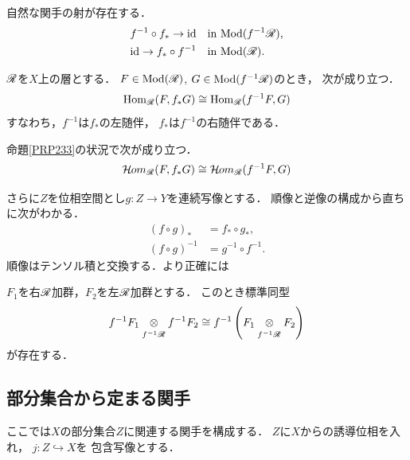 自然な関手の射が存在する．
\begin{align}
    f^{-1}\circ f_{\ast}\to\mathop{\mathrm{id}}\nolimits&\quad \text{in \(\mathop{\mathrm{Mod}}\nolimits(f^{-1}\mathscr{R})\),}\label{eq234}\\
    \mathop{\mathrm{id}}\nolimits\to f_{\ast}\circ f^{-1}&\quad\text{in \(\mathop{\mathrm{Mod}}\nolimits(\mathscr{R})\).}\label{eq235}
\end{align}

\begin{leftbar}
\begin{PRP}\label{PRP233}
    \(\mathscr{R}\)を\(X\)上の層とする．
    \(F\in\mathop{\mathrm{Mod}}\nolimits(\mathscr{R})\), \(G\in\mathop{\mathrm{Mod}}\nolimits(f^{-1}\mathscr{R})\)のとき，
    次が成り立つ．
    \begin{equation}\label{eq236}
        \mathop{\mathrm{Hom}}\nolimits_{\mathscr{R}}(F,f_{\ast}G)
        \cong
        \mathop{\mathrm{Hom}}\nolimits_{\mathscr{R}}(f^{-1}F,G)
    \end{equation}
    すなわち，\(f^{-1}\)は\(f_{\ast}\)の左随伴，
    \(f_{\ast}\)は\(f^{-1}\)の右随伴である．
\end{PRP}
\end{leftbar}

\begin{leftbar}\begin{CRL}
    命題\ref{PRP233}の状況で次が成り立つ．
    \begin{equation}\label{eq237}
        \mathop{\mathcal{H}\hspace{-0.5pt}om}\nolimits_{\mathscr{R}}(F,f_{\ast}G)
        \cong
        \mathop{\mathcal{H}\hspace{-0.5pt}om}\nolimits_{\mathscr{R}}(f^{-1}F,G)
    \end{equation}
\end{CRL}\end{leftbar}
    
さらに\(Z\)を位相空間とし\(g\colon Z\to Y\)を連続写像とする．
順像と逆像の構成から直ちに次がわかる．
\begin{align}
    \left(f\circ g\right)_{\ast}&=f_{\ast}\circ g_{\ast},\label{eq238}\\
    \left(f\circ g\right)^{-1}&=g^{-1}\circ f^{-1}.\label{eq239}
\end{align}
順像はテンソル積と交換する．より正確には
\begin{leftbar}\begin{PRP}
    \(F_1\)を右\(\mathscr{R}\)加群，\(F_2\)を左\(\mathscr{R}\)加群とする．
    このとき標準同型
    \begin{equation}
        f^{-1}F_1\ttens[f^{-1}\scR]f^{-1}F_2\cong
        f^{-1}\left(F_1\ttens[f^{-1}\scR]F_2\right)
    \end{equation}
    が存在する．
\end{PRP}\end{leftbar}
    

\subsection*{部分集合から定まる関手}
ここでは\(X\)の部分集合\(Z\)に関連する関手を構成する．
\(Z\)に\(X\)からの誘導位相を入れ，
\(j\colon Z\hookrightarrow X\)を
包含写像とする．
